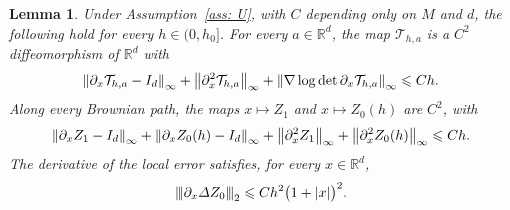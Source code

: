 \documentclass[namedate,webpdf,imanum]{ima-authoring-template}
\newcommand{\pnorm}[1]{{\vert\kern-0.25ex\vert\kern-0.25ex\vert} #1 {\vert\kern-0.25ex\vert\kern-0.25ex\vert}}
\newcommand{\Le}{\leqslant}
\theoremstyle{thmstyletwo}
\newtheorem{lemma}{Lemma}
\numberwithin{equation}{section}
\begin{document}
\begin{lemma}
\label{lem: step map}
    Under Assumption~\ref{ass: U}, with $C$ depending only on $M$ and $d$, the following hold for every $h \in (0, h_0]$. For every $a \in \mathbb R^d$, the map $\mathcal T_{h,a}$ is a $C^2$ diffeomorphism of $\mathbb R^d$ with
    \begin{equation}
        \norm{\partial_x \mathcal T_{h,a} - I_d}_\infty + \norm{\partial_x^2 \mathcal T_{h,a}}_\infty + \norm{\nabla \log\det \partial_x \mathcal T_{h,a}}_\infty \Le C h .
        \label{eq: step map bounds}
    \end{equation}
    Along every Brownian path, the maps $x \mapsto Z_1$ and $x \mapsto Z_0(h)$ are $C^2$, with
    \begin{equation}
        \norm{\partial_x Z_1 - I_d}_\infty + \norm{\partial_x Z_0(h) - I_d}_\infty + \norm{\partial_x^2 Z_1}_\infty + \norm{\partial_x^2 Z_0(h)}_\infty \Le C h .
        \label{eq: step derivatives}
    \end{equation}
    The derivative of the local error satisfies, for every $x \in \mathbb R^d$,
    \begin{equation}
        \pnorm{\partial_x \Delta Z_0}_2 \Le C h^2 \bigl( 1 + |x| \bigr)^2 .
        \label{eq: local error derivative}
    \end{equation}
\end{lemma}
\end{document}
